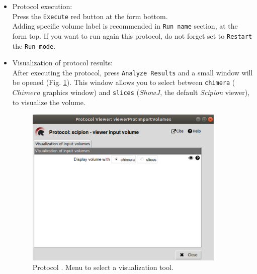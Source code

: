 \documentclass[12pt, draft]{article} %
\def\scipion{\textit{Scipion}\xspace}
\newcommand{\ffigure}[1]{{Fig. {\ref{#1}}}\xspace}
\newcommand{\scommand}[1]{{{\keys{#1}}}\xspace}
\newcommand{\ttt}[1]{\texttt{#1}}
\begin{document}
\begin{appendices}
\begin{itemize}
\begin{itemize}
  \item \ttt{Streaming} section\\
  
  Go to this section if you plan simultaneous data acquisition and processing, and select the option ``Yes''. By default, \scipion considers that you run your processes once you have finished data acquisition (option ``No'').\\
  
  \end{itemize}
  \item Protocol execution:\\
  
  Press the \ttt{Execute} red button at the form bottom.\\
  Adding specific volume label is recommended in \ttt{Run name} section, at the form top. If you want to run again this protocol, do not forget set to \ttt{Restart} the \ttt{Run mode}.\\
  
  \item Visualization of protocol results:\\
  
  After executing the protocol, press \ttt{Analyze Results} and a small window will be opened (\ffigure{fig:app_protocol_volume_2}). This window allows you to select between \ttt{chimera} ($Chimera$ graphics window) and \ttt{slices} ($ShowJ$, the default \scipion viewer), to visualize the volume.
  
  \begin{figure}[H]
    \centering 
    \captionsetup{width=.7\linewidth} 
    \includegraphics[width=0.90\textwidth]{Images_appendix/Fig101.png}
    \caption{Protocol \scommand{import volumes}. Menu to select a visualization tool.}
    \label{fig:app_protocol_volume_2}
   \end{figure}
   

\end{itemize}
\end{appendices}
\end{document}
